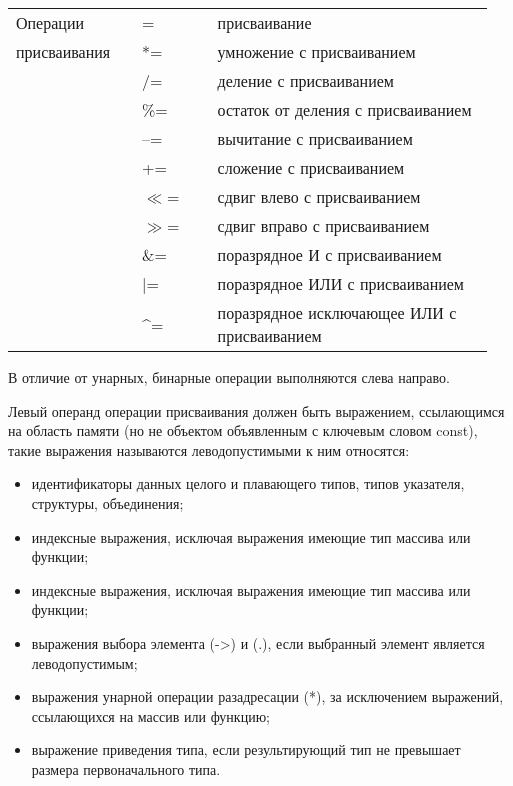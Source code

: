 \begin{center}
\begin{longtable}{|m{0.25\linewidth}|>{\centering}m{0.15\linewidth}|m{0.55\linewidth}|}
\hline  Операции        & = & присваивание \\ \cline{2-3}
присваивания            & *= & умножение с присваиванием \\ \cline{2-3}
                        & /= & деление с присваиванием \\ \cline{2-3} 
                        & \%= & остаток от деления с присваиванием \\ \cline{2-3}                        
                        & {--}= & вычитание с присваиванием \\ \cline{2-3}                           
                        & += & сложение с присваиванием \\   \cline{2-3} 
                        & $\ll$= & сдвиг влево с присваиванием \\   \cline{2-3} 
                        & $\gg$= & сдвиг вправо с присваиванием \\  \cline{2-3}   
                        & \&= & поразрядное И с присваиванием \\ \cline{2-3} 
                        & $\vert$= & поразрядное ИЛИ с присваиванием \\ \cline{2-3} 
                        & \textasciicircum= & поразрядное исключающее ИЛИ с присваиванием \\
\hline
\end{longtable}
\end{center}%

В отличие от унарных, бинарные операции выполняются слева направо. 

Левый операнд операции присваивания должен быть выражением, ссылающимся на область памяти (но не объектом объявленным с ключевым словом const), такие выражения называются леводопустимыми к ним относятся: 
\begin{itemize}
\item идентификаторы данных целого и плавающего типов, типов указателя, структуры, объединения; 
\item индексные выражения, исключая выражения имеющие тип массива или функции; 
\item индексные выражения, исключая выражения имеющие тип массива или функции; 
\item выражения выбора элемента (->) и (.), если выбранный элемент является леводопустимым; 
\item выражения унарной операции разадресации (*), за исключением выражений, ссылающихся на массив или функцию; 
\item выражение приведения типа, если результирующий тип не превышает размера первоначального типа. \killoverfullbefore \BL
\end{itemize}


